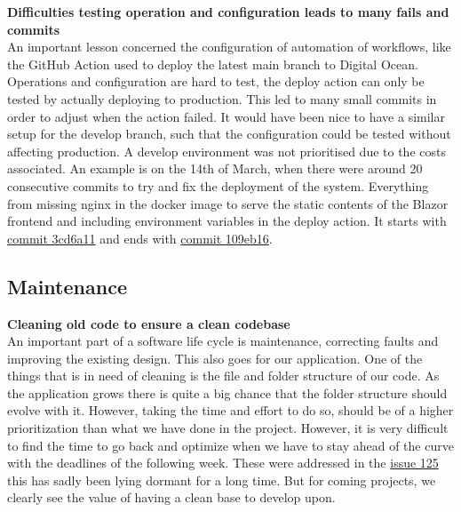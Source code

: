 \documentclass[10pt]{article}
\begin{document}
\textbf{Difficulties testing operation and configuration leads to many fails and commits}\\
An important lesson concerned the configuration of automation of workflows, like the GitHub Action used to deploy the latest main branch to Digital Ocean. Operations and configuration are hard to test, the deploy action can only be tested by actually deploying to production. This led to many small commits in order to adjust when the action failed. It would have been nice to have a similar setup for the develop branch, such that the configuration could be tested without affecting production. A develop environment was not prioritised due to the costs associated. An example is on the 14th of March, when there were around 20 consecutive commits to try and fix the deployment of the system. Everything from missing nginx in the docker image to serve the static contents of the Blazor frontend and including environment variables in the deploy action. It starts with \href{https://github.com/Arklaide/devopsITUproject/commit/3cd6a117458ed81d38d57dfeb5b15afc5e4b69f5}{commit 3cd6a11} and ends with \href{https://github.com/Arklaide/devopsITUproject/commit/11e7e21605977232ae87d0dc9dddf2ac9f25cb8f}{commit 109eb16}.

\subsection{Maintenance}

\textbf{Cleaning old code to ensure a clean codebase}\\
An important part of a software life cycle is maintenance, correcting faults and improving the existing design. This also goes for our application. One of the things that is in need of cleaning is the file and folder structure of our code. As the application grows there is quite a big chance that the folder structure should evolve with it. However, taking the time and effort to do so, should be of a higher prioritization than what we have done in the project.
However, it is very difficult to find the time to go back and optimize when we have to stay ahead of the curve with the deadlines of the following week. 
These were addressed in the  \href{https://github.com/Arklaide/devopsITUproject/issues/125}{issue 125} this has sadly been lying dormant for a long time.
But for coming projects, we clearly see the value of having a clean base to develop upon.
\end{document}
